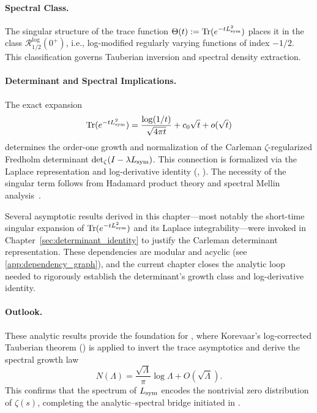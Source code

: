 \paragraph{Spectral Class.}
The singular structure of the trace function \( \Theta(t) := \operatorname{Tr}(e^{-t L_{\mathrm{sym}}^2}) \) places it in the class \( \mathcal{R}_{1/2}^{\log}(0^+) \), i.e., log-modified regularly varying functions of index \( -1/2 \). This classification governs Tauberian inversion and spectral density extraction.

\paragraph{Determinant and Spectral Implications.}
The exact expansion
\[
\operatorname{Tr}(e^{-t L_{\mathrm{sym}}^2}) = \frac{\log(1/t)}{\sqrt{4\pi t}} + c_0 \sqrt{t} + o(\sqrt{t})
\]
determines the order-one growth and normalization of the Carleman \(\zeta\)-regularized Fredholm determinant \( \det\nolimits_{\zeta}(I - \lambda L_{\mathrm{sym}}) \). This connection is formalized via the Laplace representation and log-derivative identity (, ). The necessity of the singular term follows from Hadamard product theory and spectral Mellin analysis~\cite[Ch.~III]{Korevaar2004Tauberian}.

\begin{remark}
Several asymptotic results derived in this chapter—most notably the short-time singular expansion of \( \operatorname{Tr}(e^{-t L_{\mathrm{sym}}^2}) \) and its Laplace integrability—were invoked in Chapter~\ref{sec:determinant_identity} to justify the Carleman determinant representation. These dependencies are modular and acyclic (see \cref{app:dependency_graph}), and the current chapter closes the analytic loop needed to rigorously establish the determinant’s growth class and log-derivative identity.
\end{remark}

\paragraph{Outlook.}
These analytic results provide the foundation for , where Korevaar’s log-corrected Tauberian theorem () is applied to invert the trace asymptotics and derive the spectral growth law
\[
N(\Lambda) = \frac{\sqrt{\Lambda}}{\pi} \log \Lambda + O(\sqrt{\Lambda}).
\]
This confirms that the spectrum of \( L_{\mathrm{sym}} \) encodes the nontrivial zero distribution of \( \zeta(s) \), completing the analytic–spectral bridge initiated in .
